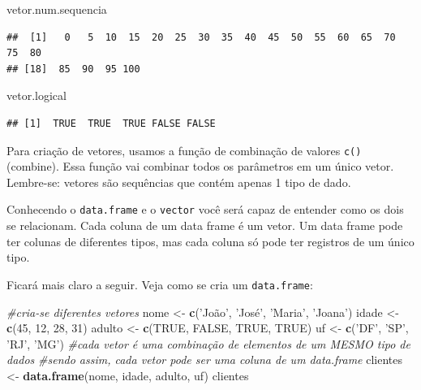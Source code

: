 \documentclass[]{book}
\newenvironment{Shaded}{\begin{snugshade}}{\end{snugshade}}
\newcommand{\KeywordTok}[1]{\textcolor[rgb]{0.13,0.29,0.53}{\textbf{#1}}}
\newcommand{\DecValTok}[1]{\textcolor[rgb]{0.00,0.00,0.81}{#1}}
\newcommand{\StringTok}[1]{\textcolor[rgb]{0.31,0.60,0.02}{#1}}
\newcommand{\CommentTok}[1]{\textcolor[rgb]{0.56,0.35,0.01}{\textit{#1}}}
\newcommand{\OtherTok}[1]{\textcolor[rgb]{0.56,0.35,0.01}{#1}}
\newcommand{\NormalTok}[1]{#1}
\begin{document}
\begin{Shaded}
\begin{Highlighting}[]
\NormalTok{vetor.num.sequencia}
\end{Highlighting}
\end{Shaded}

\begin{verbatim}
##  [1]   0   5  10  15  20  25  30  35  40  45  50  55  60  65  70  75  80
## [18]  85  90  95 100
\end{verbatim}

\begin{Shaded}
\begin{Highlighting}[]
\NormalTok{vetor.logical}
\end{Highlighting}
\end{Shaded}

\begin{verbatim}
## [1]  TRUE  TRUE  TRUE FALSE FALSE
\end{verbatim}

Para criação de vetores, usamos a função de combinação de valores
\texttt{c()} (combine). Essa função vai combinar todos os parâmetros em
um único vetor. Lembre-se: vetores são sequências que contém apenas 1
tipo de dado.

Conhecendo o \texttt{data.frame} e o \texttt{vector} você será capaz de
entender como os dois se relacionam. Cada coluna de um data frame é um
vetor. Um data frame pode ter colunas de diferentes tipos, mas cada
coluna só pode ter registros de um único tipo.

Ficará mais claro a seguir. Veja como se cria um \texttt{data.frame}:

\begin{Shaded}
\begin{Highlighting}[]
\CommentTok{#cria-se diferentes vetores}
\NormalTok{nome <-}\StringTok{ }\KeywordTok{c}\NormalTok{(}\StringTok{'João'}\NormalTok{, }\StringTok{'José'}\NormalTok{, }\StringTok{'Maria'}\NormalTok{, }\StringTok{'Joana'}\NormalTok{)}
\NormalTok{idade <-}\StringTok{ }\KeywordTok{c}\NormalTok{(}\DecValTok{45}\NormalTok{, }\DecValTok{12}\NormalTok{, }\DecValTok{28}\NormalTok{, }\DecValTok{31}\NormalTok{)}
\NormalTok{adulto <-}\StringTok{ }\KeywordTok{c}\NormalTok{(}\OtherTok{TRUE}\NormalTok{, }\OtherTok{FALSE}\NormalTok{, }\OtherTok{TRUE}\NormalTok{, }\OtherTok{TRUE}\NormalTok{)}
\NormalTok{uf <-}\StringTok{ }\KeywordTok{c}\NormalTok{(}\StringTok{'DF'}\NormalTok{, }\StringTok{'SP'}\NormalTok{, }\StringTok{'RJ'}\NormalTok{, }\StringTok{'MG'}\NormalTok{)}
\CommentTok{#cada vetor é uma combinação de elementos de um MESMO tipo de dados}
\CommentTok{#sendo assim, cada vetor pode ser uma coluna de um data.frame}
\NormalTok{clientes <-}\StringTok{ }\KeywordTok{data.frame}\NormalTok{(nome, idade, adulto, uf)}
\NormalTok{clientes}
\end{Highlighting}
\end{Shaded}
\end{document}
